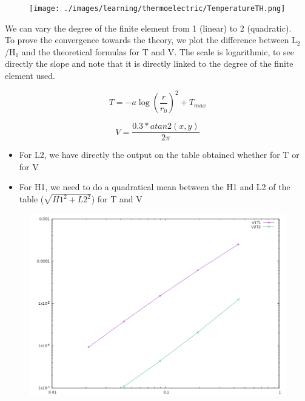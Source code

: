 \documentclass[11pt]{amsart}
\begin{document}
\begin{figure}
\centering\texttt{[image: ./images/learning/thermoelectric/TemperatureTH.png]}


\end{figure}

We can vary the degree of the finite element from 1 (linear) to 2 (quadratic). \\
To prove the convergence towards the theory, we plot the difference between L${}_{2}$/H${}_{1}$ and the theoretical formulas for T and V.
The scale is logarithmic, to see directly the slope and note that it is directly linked to the degree of the finite element used.



\[
T=-a \log(\frac{r}{r_{0}})^{2} + T_{max}
\]




\[
V=\frac{0.3*atan2(x,y)}{2\pi}
\]



\begin{itemize}

\item For L2, we have directly the output on the table obtained whether for T or for V

\item For H1, we need to do a quadratical mean between the H1 and L2 of the table ($\sqrt{H1^{2} +L2^{2}}$) for T and V

\end{itemize}


\begin{figure}
\centering\includegraphics[width=4.75truein]{./images/learning/thermoelectric/L2V.png}


\end{figure}
\end{document}
